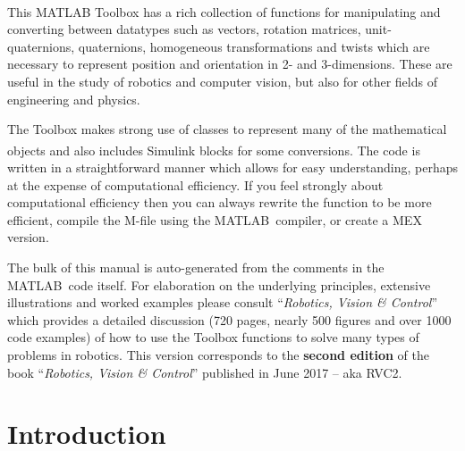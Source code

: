 \documentclass[a4paper,twoside]{report}
\def\Mlab{MATLAB}
\begin{document}
This \Mlab\textsuperscript{\textregistered} Toolbox has a rich collection of functions for manipulating and converting between datatypes such as vectors, rotation matrices, unit-quaternions, quaternions, homogeneous transformations and twists which are necessary to represent  position and orientation in 2- and 3-dimensions.
These are useful in the study of robotics and computer vision, but also for other fields of engineering and physics.

The Toolbox makes strong use of classes to represent many of the mathematical objects and also 
includes Simulink\textsuperscript{\textregistered} blocks for some conversions.
The code is written in a straightforward manner which allows
for easy understanding, perhaps at the expense of computational efficiency.
If you feel strongly about computational efficiency then you can always
rewrite the function to be more efficient,
compile the M-file using the \Mlab\   compiler, or
create a MEX version.

The bulk of this manual is auto-generated from the comments in the \Mlab\ code itself.
For elaboration on the underlying principles, extensive illustrations and worked examples please consult
 ``\textit{Robotics, Vision \& Control}''  which provides a detailed discussion (720 pages, nearly 500 figures and over 1000 code examples) of how to use the Toolbox functions to solve many types of problems in robotics.
This version corresponds to the \textbf{second edition} of the book ``\textit{Robotics, Vision \& Control}'' published in June 2017 -- aka RVC2.


\cleardoublepage
\tableofcontents

\newpage
\chapter{Introduction}
\end{document}
